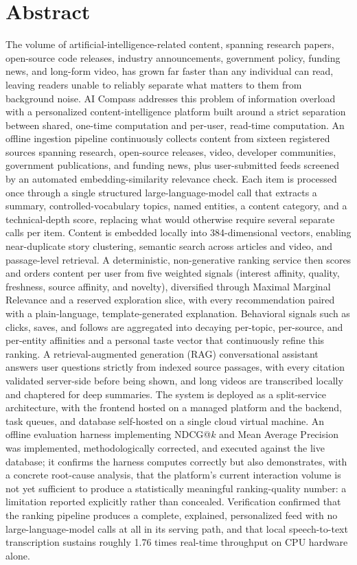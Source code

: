 \chapter*{Abstract}

The volume of artificial-intelligence-related content, spanning research papers, open-source code releases, industry announcements, government policy, funding news, and long-form video, has grown far faster than any individual can read, leaving readers unable to reliably separate what matters to them from background noise. AI Compass addresses this problem of information overload with a personalized content-intelligence platform built around a strict separation between shared, one-time computation and per-user, read-time computation. An offline ingestion pipeline continuously collects content from sixteen registered sources spanning research, open-source releases, video, developer communities, government publications, and funding news, plus user-submitted feeds screened by an automated embedding-similarity relevance check. Each item is processed once through a single structured large-language-model call that extracts a summary, controlled-vocabulary topics, named entities, a content category, and a technical-depth score, replacing what would otherwise require several separate calls per item. Content is embedded locally into 384-dimensional vectors, enabling near-duplicate story clustering, semantic search across articles and video, and passage-level retrieval. A deterministic, non-generative ranking service then scores and orders content per user from five weighted signals (interest affinity, quality, freshness, source affinity, and novelty), diversified through Maximal Marginal Relevance and a reserved exploration slice, with every recommendation paired with a plain-language, template-generated explanation. Behavioral signals such as clicks, saves, and follows are aggregated into decaying per-topic, per-source, and per-entity affinities and a personal taste vector that continuously refine this ranking. A retrieval-augmented generation (RAG) conversational assistant answers user questions strictly from indexed source passages, with every citation validated server-side before being shown, and long videos are transcribed locally and chaptered for deep summaries. The system is deployed as a split-service architecture, with the frontend hosted on a managed platform and the backend, task queues, and database self-hosted on a single cloud virtual machine. An offline evaluation harness implementing NDCG@$k$ and Mean Average Precision was implemented, methodologically corrected, and executed against the live database; it confirms the harness computes correctly but also demonstrates, with a concrete root-cause analysis, that the platform's current interaction volume is not yet sufficient to produce a statistically meaningful ranking-quality number: a limitation reported explicitly rather than concealed. Verification confirmed that the ranking pipeline produces a complete, explained, personalized feed with no large-language-model calls at all in its serving path, and that local speech-to-text transcription sustains roughly 1.76 times real-time throughput on CPU hardware alone. 